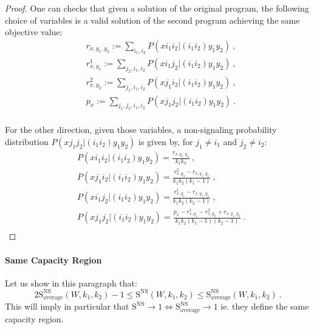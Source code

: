 \documentclass[11pt]{article}
\theoremstyle{definition}
\theoremstyle{remark}
\begin{document}
\begin{proof}
  One can checks that given a solution of the original program, the following choice of variables is a valid solution of the second program achieving the same objective value:
\begin{equation}
  \begin{aligned}
    &r_{x,y_1,y_2} := \sum_{i_1,i_2} P(xi_1i_2|(i_1i_2)y_1y_2)\ ,\\
    &r^1_{x,y_1} := \sum_{j_2,i_1,i_2} P(xi_1j_2|(i_1i_2)y_1y_2)\ ,\\
    &r^2_{x,y_2} := \sum_{j_1,i_1,i_2} P(xj_1i_2|(i_1i_2)y_1y_2)\ ,\\
    &p_x := \sum_{j_1,j_2,i_1,i_2} P(xj_1j_2|(i_1i_2)y_1y_2) \ .\\
  \end{aligned}
\end{equation}

For the other direction, given those variables, a non-signaling probability distribution $P(xj_1j_2|(i_1i_2)y_1y_2)$ is given by, for $j_1 \not= i_1$ and $j_2 \not= i_2$:
\begin{equation}
  \begin{aligned}
    &P(xi_1i_2|(i_1i_2)y_1y_2) = \frac{r_{x,y_1,y_2}}{k_1k_2}  \ ,\\
    &P(xj_1i_2|(i_1i_2)y_1y_2) = \frac{r^2_{x,y_2} - r_{x,y_1,y_2}}{k_1k_2(k_1-1)}  \ ,\\
    &P(xi_1j_2|(i_1i_2)y_1y_2) = \frac{r^1_{x,y_1} - r_{x,y_1,y_2}}{k_1k_2(k_2-1)} \ ,\\
    &P(xj_1j_2|(i_1i_2)y_1y_2) = \frac{p_{x} -  r^1_{x,y_1} - r^2_{x,y_2} + r_{x,y_1,y_2}}{k_1k_2(k_1-1)(k_2-1)} \ .\\
  \end{aligned}
\end{equation}
\end{proof}

\paragraph{Same Capacity Region}
Let us show in this paragraph that:
\[ 2 \mathrm{S}_{\text{average}}^{\mathrm{NS}}(W,k_1,k_2)-1 \leq  \mathrm{S}^{\mathrm{NS}}(W,k_1,k_2) \leq \mathrm{S}_{\text{average}}^{\mathrm{NS}}(W,k_1,k_2) \ . \]
This will imply in particular that $\mathrm{S}^{\mathrm{NS}} \rightarrow 1 \iff \mathrm{S}_{\text{average}}^{\mathrm{NS}} \rightarrow 1$ ie. they define the same capacity region.
\end{document}
